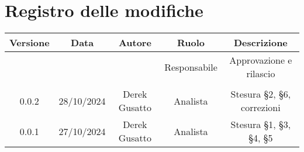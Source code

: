 
\section*{Registro delle modifiche}
\begin{table}[H]
    \begin{tabular}{|c|c|c|c|c|}
        \hline
         \textbf{Versione} &  \textbf{Data} &  \textbf{Autore} &  \textbf{Ruolo} & \textbf{Descrizione} \\
          \hline
          &  &  & Responsabile & Approvazione e rilascio\\
          \hline
          &  &  &  &  \\
          \hline
          0.0.2&  28/10/2024&Derek Gusatto  & Analista &  Stesura §2, §6, correzioni\\
          \hline
          0.0.1&  27/10/2024&Derek Gusatto  & Analista &  Stesura §1, §3, §4,  §5\\
          \hline
    \end{tabular}
\end{table}